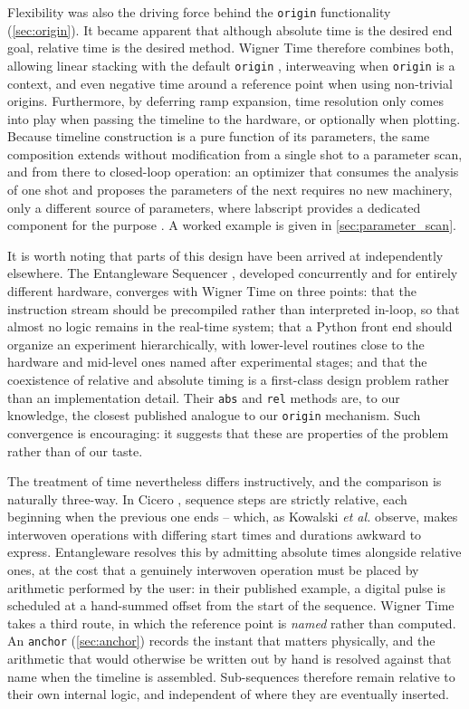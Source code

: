 \documentclass{SciPost}
\newcommand{\python}[1]{%
  \texttt{#1}%
}
\begin{document}
Flexibility was also the driving force behind the \python{origin} functionality (\cref{sec:origin}). It became apparent that although absolute time is the desired end goal, relative time is the desired method. Wigner Time therefore combines both, allowing linear stacking with the default \python{origin}, interweaving when \python{origin} is a context, and even negative time around a reference point when using non-trivial origins. Furthermore, by deferring ramp expansion, time resolution only comes into play when passing the timeline to the hardware, or optionally when plotting. Because timeline construction is a pure function of its parameters, the same composition extends without modification from a single shot to a parameter scan, and from there to closed-loop operation: an optimizer that consumes the analysis of one shot and proposes the parameters of the next requires no new machinery, only a different source of parameters, where labscript provides a dedicated component for the purpose \cite{starkey2013labscript}. A worked example is given in \cref{sec:parameter_scan}.
 
It is worth noting that parts of this design have been arrived at independently elsewhere. The Entangleware Sequencer \cite{kowalski2023entangleware}, developed concurrently and for entirely different hardware, converges with Wigner Time on three points: that the instruction stream should be precompiled rather than interpreted in-loop, so that almost no logic remains in the real-time system; that a Python front end should organize an experiment hierarchically, with lower-level routines close to the hardware and mid-level ones named after experimental stages; and that the coexistence of relative and absolute timing is a first-class design problem rather than an implementation detail. Their \python{abs} and \python{rel} methods are, to our knowledge, the closest published analogue to our \python{origin} mechanism. Such convergence is encouraging: it suggests that these are properties of the problem rather than of our taste.
 
The treatment of time nevertheless differs instructively, and the comparison is naturally three-way. In Cicero \cite{keshet2013distributed}, sequence steps are strictly relative, each beginning when the previous one ends – which, as Kowalski \textit{et al.} observe, makes interwoven operations with differing start times and durations awkward to express. Entangleware resolves this by admitting absolute times alongside relative ones, at the cost that a genuinely interwoven operation must be placed by arithmetic performed by the user: in their published example, a digital pulse is scheduled at a hand-summed offset from the start of the sequence. Wigner Time takes a third route, in which the reference point is \emph{named} rather than computed. An \python{anchor} (\cref{sec:anchor}) records the instant that matters physically, and the arithmetic that would otherwise be written out by hand is resolved against that name when the timeline is assembled. Sub-sequences therefore remain relative to their own internal logic, and independent of where they are eventually inserted.
 
\end{document}
